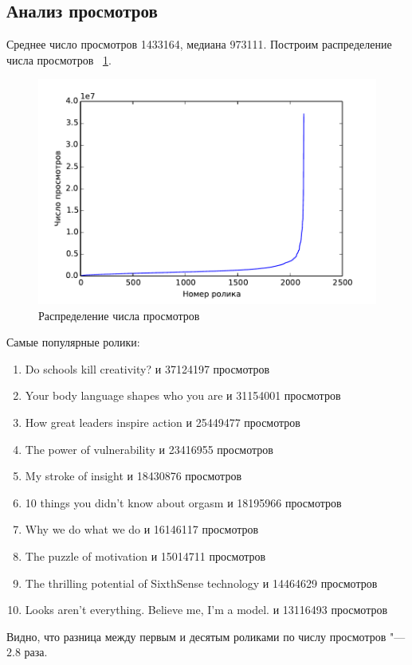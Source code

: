 \documentclass[12pt,a4paper]{scrartcl}
\begin{document}
\subsection{Анализ просмотров}
Среднее число просмотров 1433164, медиана 973111. Построим распределение числа просмотров ~\ref{views}.
\begin{figure}[hbp]
\includegraphics{views.pdf}
\caption{Распределение числа просмотров}
\label{views}
\end{figure}
Самые популярные ролики:
\begin{enumerate}
\item Do schools kill creativity? и 37124197 просмотров
\item Your body language shapes who you are и 31154001 просмотров
\item How great leaders inspire action и 25449477 просмотров
\item The power of vulnerability и 23416955 просмотров
\item My stroke of insight и 18430876 просмотров
\item 10 things you didn't know about orgasm и 18195966 просмотров
\item Why we do what we do и 16146117 просмотров
\item The puzzle of motivation и 15014711 просмотров
\item The thrilling potential of SixthSense technology и 14464629 просмотров
\item Looks aren't everything. Believe me, I'm a model. и 13116493 просмотров
\end{enumerate}
Видно, что разница между первым и десятым роликами по числу просмотров "--- $2.8$ раза.
\end{document}
